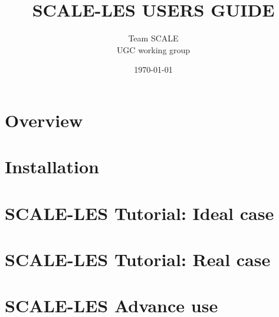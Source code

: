 \documentclass[a4paper]{jreport}
\title{{\Huge SCALE-LES USERS GUIDE \\
   \vspace{1cm}{\Large  SCALE Version 0.2.0 (SCALE-LES Version: 4.2.0) 版} }}
\author{\Large Team SCALE\\ UGC working group}
\date{\today}
\begin{document}
\maketitle
\tableofcontents

\chapter{Overview}
\label{sec:overview}

%

\chapter{Installation}
\label{sec:install}


\chapter{SCALE-LES Tutorial: Ideal case}
\label{sec:tuto_ideal}


\chapter{SCALE-LES Tutorial: Real case}
\label{sec:tuto_real}






\chapter{SCALE-LES Advance use}
\label{sec:advance}









\appendix




\end{document}
